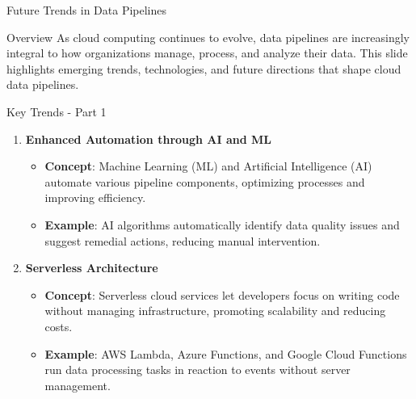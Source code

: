 \documentclass[aspectratio=169]{beamer}
\begin{document}
\begin{frame}{Future Trends in Data Pipelines}
    \begin{block}{Overview}
        As cloud computing continues to evolve, data pipelines are increasingly integral to how organizations manage, process, and analyze their data. This slide highlights emerging trends, technologies, and future directions that shape cloud data pipelines.
    \end{block}
\end{frame}

\begin{frame}{Key Trends - Part 1}
    \begin{enumerate}
        \item \textbf{Enhanced Automation through AI and ML}
            \begin{itemize}
                \item \textbf{Concept}: Machine Learning (ML) and Artificial Intelligence (AI) automate various pipeline components, optimizing processes and improving efficiency.
                \item \textbf{Example}: AI algorithms automatically identify data quality issues and suggest remedial actions, reducing manual intervention.
            \end{itemize}
        
        \item \textbf{Serverless Architecture}
            \begin{itemize}
                \item \textbf{Concept}: Serverless cloud services let developers focus on writing code without managing infrastructure, promoting scalability and reducing costs.
                \item \textbf{Example}: AWS Lambda, Azure Functions, and Google Cloud Functions run data processing tasks in reaction to events without server management.
            \end{itemize}
    \end{enumerate}
\end{frame}
\end{document}
